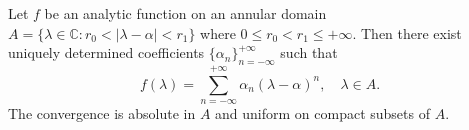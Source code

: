 Let $f$ be an analytic function on an annular domain $A = \{\lambda \in \mathbb{C} : r_0 < |\lambda - \alpha| < r_1\}$ where $0 \leq r_0 < r_1 \leq +\infty$. Then there exist uniquely determined coefficients $\{\alpha_n\}_{n=-\infty}^{+\infty}$ such that
$$f(\lambda) = \sum_{n=-\infty}^{+\infty} \alpha_n (\lambda - \alpha)^n, \quad \lambda \in A.$$
The convergence is absolute in $A$ and uniform on compact subsets of $A$.
